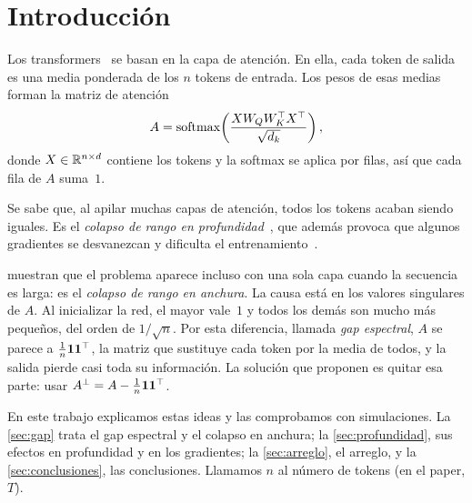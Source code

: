\section{Introducción}\label{sec:intro}

Los transformers~\cite{vaswani2017attention} se basan en la capa de atención.
En ella, cada token de salida es una media ponderada de los $n$ tokens de
entrada. Los pesos de esas medias forman la matriz de atención
\begin{equation}\label{eq:atencion}
  A = \operatorname{softmax}\!\left(\frac{X W_Q W_K^{\top} X^{\top}}{\sqrt{d_k}}\right),
\end{equation}
donde $X \in \mathbb{R}^{n\times d}$ contiene los tokens y la softmax se aplica por
filas, así que cada fila de $A$ suma~$1$.

Se sabe que, al apilar muchas capas de atención, todos los tokens acaban siendo
iguales. Es el \emph{colapso de rango en profundidad}~\cite{dong2021attention},
que además provoca que algunos gradientes se desvanezcan y dificulta el
entrenamiento~\cite{noci2022signal}.

\textcite{naitsaada2025mind} muestran que el problema aparece incluso con una
sola capa cuando la secuencia es larga: es el \emph{colapso de rango en
anchura}. La causa está en los valores singulares de $A$. Al inicializar la
red, el mayor vale~$1$ y todos los demás son mucho más pequeños, del orden de
$1/\sqrt{n}$. Por esta diferencia, llamada \emph{gap espectral}, $A$ se parece a
$\tfrac{1}{n}\mathbf{1}\mathbf{1}^{\top}$, la matriz que sustituye cada token por la media
de todos, y la salida pierde casi toda su información. La solución que proponen
es quitar esa parte: usar $A^{\perp} = A - \tfrac{1}{n}\mathbf{1}\mathbf{1}^{\top}$.

En este trabajo explicamos estas ideas y las comprobamos con simulaciones. La
\cref{sec:gap} trata el gap espectral y el colapso en anchura; la
\cref{sec:profundidad}, sus efectos en profundidad y en los gradientes; la
\cref{sec:arreglo}, el arreglo, y la \cref{sec:conclusiones}, las conclusiones.
Llamamos $n$ al número de tokens (en el paper, $T$).
